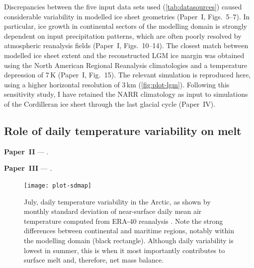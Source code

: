\documentclass[a4paper]{kappa}
\newcommand{\CCLI}[0]{Paper~I}      %
\newcommand{\PSDV}[0]{Paper~II}     %
\newcommand{\PSDP}[0]{Paper~III}    %
\newcommand{\CCYC}[0]{Paper~IV}     %
\begin{document}
Discrepancies between the five input data sets used (\cref{tab:datasources})
caused considerable variability in modelled ice sheet geometries (\CCLI,
Figs.~5--7). In particular, ice growth in continental sectors of the modelling
domain is strongly dependent on input precipitation patterns, which are often
poorly resolved by atmospheric reanalysis fields
(\CCLI, Figs.~10--14). The closest match between modelled ice sheet extent and
the reconstructed LGM ice margin \citep{Dyke.2004} was obtained using the North
American Regional Reanalysis \citep[NARR,][]{Mesinger.etal.2006} climatologies
and a temperature depression of 7\,K (\CCLI, Fig.~15). The relevant simulation
is reproduced here, using a higher horizontal resolution of 3\,km
(\cref{fig:plot-lgm}). Following this sensitivity study, I have retained the
NARR climatology as input to simulations of the Cordilleran ice sheet through
the last glacial cycle (\CCYC).


\subsection{Role of daily temperature variability on melt}

\noindent\textbf{\PSDV} --- .
\bigskip

\noindent\textbf{\PSDP} --- .
\bigskip

\begin{figure}
  \texttt{[image: plot-sdmap]}
  \caption{July, daily temperature variability in the Arctic, as shown by
           monthly standard deviation of near-surface daily mean air
           temperature computed from ERA-40 reanalysis
           \citep{Uppala.etal.2005}. Note the strong differences between
           continental and maritime regions, notably within the modelling domain
           (black rectangle). Although daily variability is lowest in summer,
           this is when it most importantly contributes to surface melt and,
           therefore, net mass balance.}
  \label{fig:plot-sdmap}
\end{figure}
\end{document}
